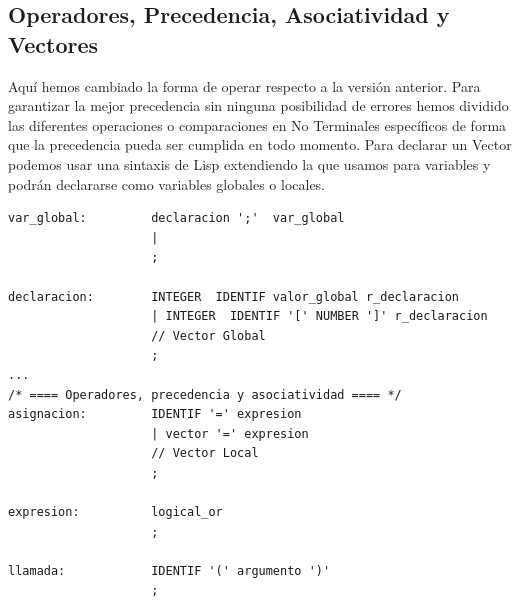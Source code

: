 \documentclass[12pt,a4paper]{article}
\begin{document}
\subsection{Operadores, Precedencia, Asociatividad y Vectores}
\noindent Aquí hemos cambiado la forma de operar respecto a la versión anterior. Para garantizar 
la mejor precedencia sin ninguna posibilidad de errores hemos dividido las diferentes operaciones 
o comparaciones en No Terminales específicos de forma que la precedencia pueda ser cumplida en todo 
momento.
\noindent Para declarar un Vector podemos usar una sintaxis de Lisp extendiendo la que usamos para 
variables y podrán declararse como variables globales o locales. 
\begin{lstlisting}
var_global:         declaracion ';'  var_global                         
                    |                                                   
                    ;

declaracion:        INTEGER  IDENTIF valor_global r_declaracion         
                    | INTEGER  IDENTIF '[' NUMBER ']' r_declaracion
                    // Vector Global     
                    ; 
...
/* ==== Operadores, precedencia y asociatividad ==== */
asignacion:         IDENTIF '=' expresion                               
                    | vector '=' expresion    
                    // Vector Local                           
                    ;

expresion:          logical_or                                         
                    ;

llamada:            IDENTIF '(' argumento ')'                           
                    ;


\end{lstlisting}
\end{document}
